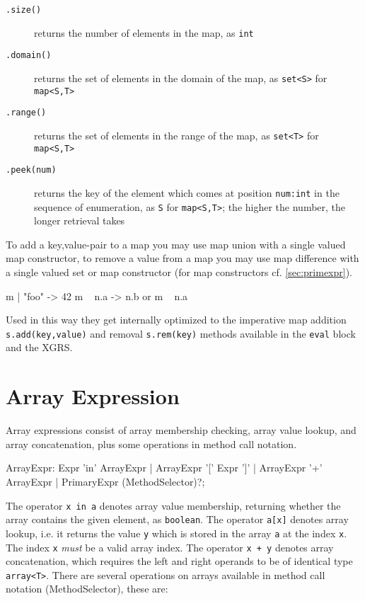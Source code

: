 \begin{description}
\item[\texttt{.size()}] returns the number of elements in the map, as \texttt{int}
\item[\texttt{.domain()}] returns the set of elements in the domain of the map, as \verb#set<S># for \verb#map<S,T>#
\item[\texttt{.range()}] returns the set of elements in the range of the map, as \verb#set<T># for \verb#map<S,T>#
\item[\texttt{.peek(num)}] returns the key of the element which comes at position \texttt{num:int} in the sequence of enumeration, as \texttt{S} for \verb#map<S,T>#; the higher the number, the longer retrieval takes
\end{description}

\begin{note}
To add a key,value-pair to a map you may use map union with a single valued map constructor,
to remove a value from a map you may use map difference with a single valued set or map constructor (for map constructors cf. \ref{sec:primexpr}).
\begin{grgen}
m | { "foo" -> 42 }
m \ { n.a -> n.b } or m \ { n.a }
\end{grgen}
Used in this way they get internally optimized to the imperative map addition \texttt{s.add(key,value)} and removal \texttt{s.rem(key)} methods available in the \texttt{eval} block and the XGRS.
\end{note}


\section{Array Expression} \label{sec:arrayexpr}

Array expressions consist of array membership checking, array value lookup, and array concatenation, plus some operations in method call notation.

\begin{rail}
  ArrayExpr: Expr 'in' ArrayExpr | ArrayExpr '[' Expr ']' | ArrayExpr '+' ArrayExpr | PrimaryExpr (MethodSelector)?;
\end{rail}

The operator \texttt{x in a} denotes array value membership, returning whether the array contains the given element, as \texttt{boolean}.
The operator \texttt{a[x]} denotes array lookup, i.e. it returns the value \texttt{y} which is stored in the array \texttt{a} at the index \texttt{x}.
The index \texttt{x} \emph{must} be a valid array index.
The operator \texttt{x + y} denotes array concatenation, which requires the left and right operands to be of identical type \verb#array<T>#.
There are several operations on arrays available in method call notation (MethodSelector), these are:

